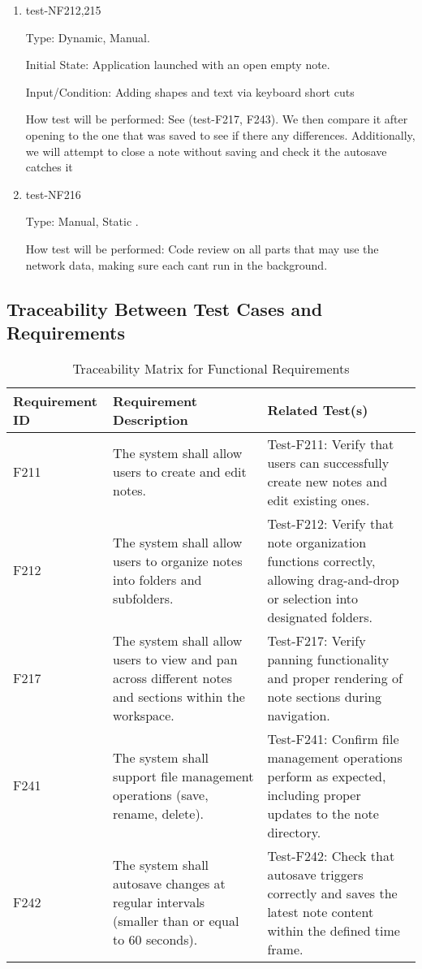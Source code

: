 \documentclass[12pt, titlepage]{article}
\begin{document}
\begin{enumerate}

\item{test-NF212,215}

Type: Dynamic, Manual.

Initial State: Application launched with an open empty note.

Input/Condition: Adding shapes and text via keyboard short cuts

How test will be performed: See (test-F217, F243). We then compare it after opening to the one that was saved to see if there any differences. Additionally, we will attempt to close a note without saving and check it the autosave catches it 

\item{test-NF216}

Type: Manual, Static .

How test will be performed: Code review on all parts that may use the network data, making sure each cant run in the background.

\end{enumerate}


\subsection{Traceability Between Test Cases and Requirements}


\begin{table}[H]
\centering
\caption{Traceability Matrix for Functional Requirements}
\begin{tabular}{|p{2.5cm}|p{6cm}|p{6cm}|}
\hline
\textbf{Requirement ID} & \textbf{Requirement Description} & \textbf{Related Test(s)} \\
\hline
F211 & The system shall allow users to create and edit notes. & Test-F211: Verify that users can successfully create new notes and edit existing ones. \\
\hline
F212 & The system shall allow users to organize notes into folders and subfolders. & Test-F212: Verify that note organization functions correctly, allowing drag-and-drop or selection into designated folders. \\
\hline
F217 & The system shall allow users to view and pan across different notes and sections within the workspace. & Test-F217: Verify panning functionality and proper rendering of note sections during navigation. \\
\hline
F241 & The system shall support file management operations (save, rename, delete). & Test-F241: Confirm file management operations perform as expected, including proper updates to the note directory. \\
\hline
F242 & The system shall autosave changes at regular intervals (smaller than or equal to 60 seconds). & Test-F242: Check that autosave triggers correctly and saves the latest note content within the defined time frame. \\
\hline
\end{tabular}
\end{table}
\end{document}
